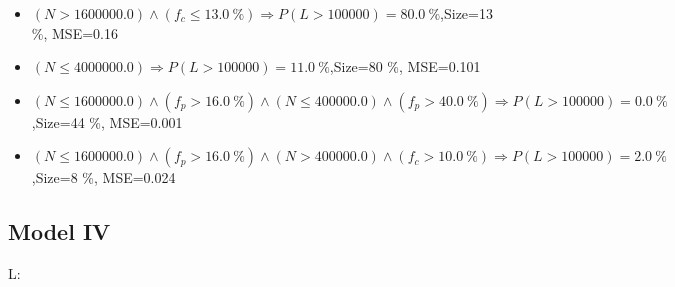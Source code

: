 \documentclass[numbered]{CSL}
\begin{document}
\begin{itemize}
\item $(N > 1600000.0) \land (f_c \leq 13.0~\%) \Rightarrow P(L > 100 000) = 80.0~\%$,\hfill Size=13 \%, MSE=0.16
\item $(N \leq 4000000.0) \Rightarrow P(L > 100 000) = 11.0~\%$,\hfill Size=80 \%, MSE=0.101
\item $(N \leq 1600000.0) \land (f_p > 16.0~\%) \land (N \leq 400000.0) \land (f_p > 40.0~\%) \Rightarrow P(L > 100 000) = 0.0~\%$,\hfill Size=44 \%, MSE=0.001
\item $(N \leq 1600000.0) \land (f_p > 16.0~\%) \land (N > 400000.0) \land (f_c > 10.0~\%) \Rightarrow P(L > 100 000) = 2.0~\%$,\hfill Size=8 \%, MSE=0.024
\end{itemize}

\subsection{Model IV}
L:
\end{document}
